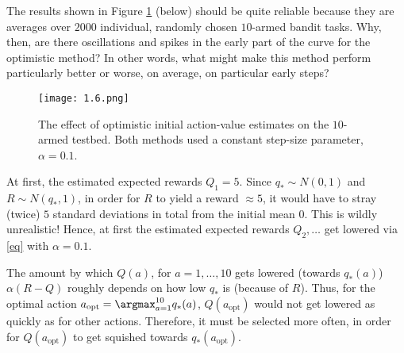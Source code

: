 
\begin{exercise}

The results shown in Figure \ref{fig:1.6} (below) should be quite reliable because they are averages over $2000$ individual, randomly chosen $10$-armed bandit tasks.
Why, then, are there oscillations and spikes in the early part of the curve for the optimistic method?
In other words, what might make this method perform particularly better or worse, on average, on particular early steps?

\begin{figure}[H]
    \centering
    \texttt{[image: 1.6.png]}
    \caption
    {
        The effect of optimistic initial action-value estimates on the $10$-armed testbed.
        Both methods used a constant step-size parameter, $\alpha = 0.1$.
    }
    \label{fig:1.6}
\end{figure}

\end{exercise}


\begin{solution}

At first, the estimated expected rewards $Q_1 = 5$.
Since $q_\ast \sim N(0, 1)$ and $R \sim N(q_\ast, 1)$, in order for $R$ to yield a reward $\approx 5$, it would have to stray (twice) $5$ standard deviations in total from the initial mean $0$.
This is wildly unrealistic!
Hence, at first the estimated expected rewards $Q_2, \dots$ get lowered via \eqref{eq} with $\alpha = 0.1$.

The amount by which $Q(a)$, for $a = 1, \dots, 10$ gets lowered (towards $q_\ast(a)$) $\alpha (R - Q)$ roughly depends on how low $q_\ast$ is (because of $R$).
Thus, for the optimal action $a_\text{opt} = \argmax_{a=1}^{10} q_\ast(a)$, $Q(a_\text{opt})$ would not get lowered as quickly as for other actions.
Therefore, it must be selected more often, in order for $Q(a_\text{opt})$ to get squished towards $q_\ast(a_\text{opt})$.

\end{solution}

